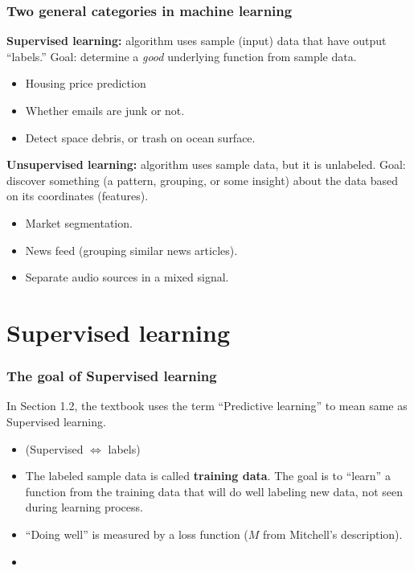 \documentclass{beamer}
\theoremstyle{example}
\begin{document}
\begin{frame}
\frametitle{Two general categories in machine learning}

\textbf{Supervised learning:} algorithm uses sample (input) data that have output ``labels.'' Goal: determine a \emph{good} underlying function from sample data.
\pause
    \begin{itemize}
        \item Housing price prediction
        \pause
        \item Whether emails are junk or not.
        \pause
        \item Detect space debris, or trash on ocean surface.
    \end{itemize}
\pause
\textbf{Unsupervised learning:} algorithm uses sample data, but it is unlabeled. Goal: discover something (a pattern, grouping, or some insight) about the data based on its coordinates (features).
\pause
    \begin{itemize}
        \item Market segmentation.
        \pause
        \item News feed (grouping similar news articles).
        \pause
        \item Separate audio sources in a mixed signal.
    \end{itemize}

\end{frame}

\section{Supervised learning}

\begin{frame}
\frametitle{The goal of Supervised learning}
In Section 1.2, the textbook uses the term ``Predictive learning'' to mean same as Supervised learning. 
\begin{itemize}
    \item (Supervised $\iff$ labels) 
    \pause
    \item The labeled sample data is called \textbf{training data}. The goal is to ``learn'' a function from the training data that will do well labeling new data, not seen during learning process. 
    \pause
    \item ``Doing well'' is measured by a loss function ($M$ from Mitchell's description). 
    \item {}
\end{itemize}
\end{frame}
\end{document}
